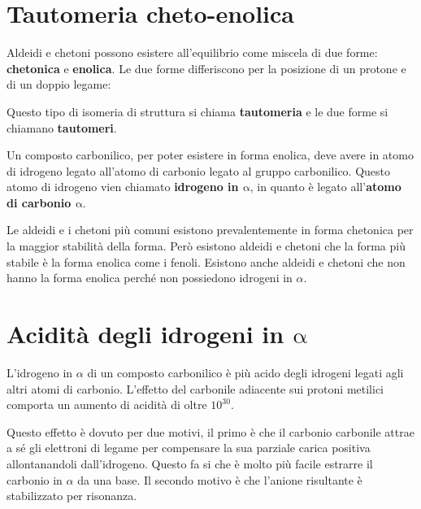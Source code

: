 \section{Tautomeria cheto-enolica}
Aldeidi e chetoni possono esistere all'equilibrio come miscela di due forme: \textbf{chetonica} e \textbf{enolica}. Le due forme differiscono per la posizione di un protone e di un doppio legame:

\begin{reaction}
	\arrow{<=>}
\end{reaction}

Questo tipo di isomeria di struttura si chiama \textbf{tautomeria} e le due forme si chiamano \textbf{tautomeri}.

Un composto carbonilico, per poter esistere in forma enolica, deve avere in atomo di idrogeno legato all'atomo di carbonio legato al gruppo carbonilico. Questo atomo di idrogeno vien chiamato \textbf{idrogeno in \(\bm{\mathrm{\alpha}}\)}, in quanto è legato all'\textbf{atomo di carbonio \(\bm{\mathrm{\alpha}}\)}.

Le aldeidi e i chetoni più comuni esistono prevalentemente in forma chetonica per la maggior stabilità della forma. Però esistono aldeidi e chetoni che la forma più stabile è la forma enolica come i fenoli. Esistono anche aldeidi e chetoni che non hanno la forma enolica perché non possiedono idrogeni in \(\alpha\).


\section[Acidità degli idrogeni in \texorpdfstring{\(\alpha\)}{α}]{Acidità degli idrogeni in \texorpdfstring{\(\bm{\mathrm{\alpha}}\)}{α}}
L'idrogeno in \(\alpha\) di un composto carbonilico è più acido degli idrogeni legati agli altri atomi di carbonio. L'effetto del carbonile adiacente sui protoni metilici comporta un aumento di acidità di oltre \(10^{30}\).

Questo effetto è dovuto per due motivi, il primo è che il carbonio carbonile attrae a sé gli elettroni di legame per compensare la sua parziale carica positiva allontanandoli dall'idrogeno. Questo fa si che è molto più facile estrarre il carbonio in \(\alpha\) da una base. Il secondo motivo è che l'anione risultante è stabilizzato per risonanza.

